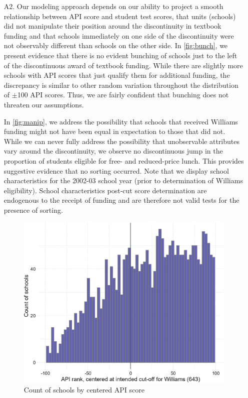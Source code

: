 \documentclass[a4paper, 11pt]{article}
\begin{document}
\begin{enumerate}
	\item[A2.] Our modeling approach depends on our ability to project a smooth relationship between API score and student test scores, that units (schools) did not manipulate their position around the discontinuity in textbook funding and that schools immediately on one side of the discontinuity were not observably different than schools on the other side. In \autoref{fig:bunch}, we present evidence that there is no evident bunching of schools just to the left of the discontinuous award of textbook funding. While there are slightly more schools with API scores that just qualify them for additional funding, the discrepancy is similar to other random variation throughout the distribution of $\pm$100 API scores. Thus, we are fairly confident that bunching does not threaten our assumptions.

	In \autoref{fig:manip}, we address the possibility that schools that received Williams funding might not have been equal in expectation to those that did not. While we can never fully address the possibility that unobservable attributes vary around the discontinuity, we observe no discontinuous jump in the proportion of students eligible for free- and reduced-price lunch. This provides suggestive evidence that no sorting occurred. Note that we display school characteristics for the 2002-03 school year (prior to determination of Williams eligibility). School characteristics post-cut score determination are endogenous to the receipt of funding and are therefore not valid tests for the presence of sorting.

\begin{figure} 
\begin{center}
\includegraphics[scale=0.8]{figures/williams_bunch.png}
\caption{Count of schools by centered API score}
\label{fig:bunch}
\end{center}
\end{figure}


\end{enumerate}
\end{document}
